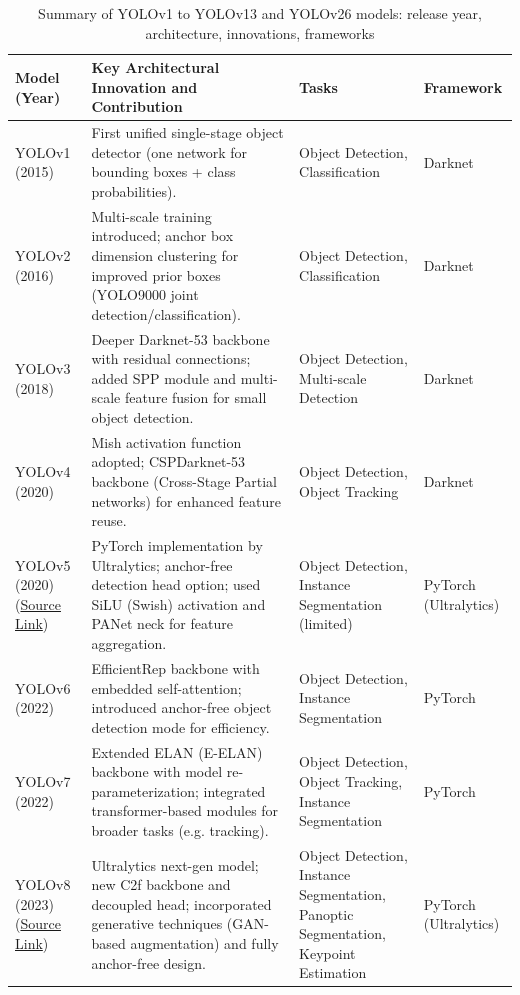 \documentclass{article}
\begin{document}
\begin{table}[h!]\centering
\caption{Summary of YOLOv1 to YOLOv13 and YOLOv26 models: release year, architecture, innovations, frameworks}
\label{tab:comparison}
\scriptsize
\begin{tabular}{p{4cm} p{6.5cm} p{2.2cm} p{2cm}}
\hline
\textbf{Model (Year)} & \textbf{Key Architectural Innovation and Contribution} & \textbf{Tasks} & \textbf{Framework} \\
\hline
YOLOv1 (2015) \cite{redmon2016you} & First unified single-stage object detector (one network for bounding boxes + class probabilities). & Object Detection, Classification & Darknet \\
YOLOv2 (2016)  \cite{redmon2017yolo9000} & Multi-scale training introduced; anchor box dimension clustering for improved prior boxes (YOLO9000 joint detection/classification). & Object Detection, Classification & Darknet \\
YOLOv3 (2018) \cite{redmon2018yolov3} & Deeper Darknet-53 backbone with residual connections; added SPP module and multi-scale feature fusion for small object detection. & Object Detection, Multi-scale Detection & Darknet \\
YOLOv4 (2020) \cite{bochkovskiy2020yolov4} & Mish activation function adopted; CSPDarknet-53 backbone (Cross-Stage Partial networks) for enhanced feature reuse. & Object Detection, Object Tracking & Darknet \\
YOLOv5 (2020) (\href{https://github.com/ultralytics/yolov5}{Source Link}) & PyTorch implementation by Ultralytics; anchor-free detection head option; used SiLU (Swish) activation and PANet neck for feature aggregation. & Object Detection, Instance Segmentation (limited) & PyTorch \newline  (Ultralytics) \\
YOLOv6 (2022) \cite{li2022yolov6} & EfficientRep backbone with embedded self-attention; introduced anchor-free object detection mode for efficiency. & Object Detection, Instance Segmentation & PyTorch \\
YOLOv7 (2022) \cite{wang2023yolov7} & Extended ELAN (E-ELAN) backbone with model re-parameterization; integrated transformer-based modules for broader tasks (e.g. tracking). & Object Detection, Object Tracking, Instance Segmentation & PyTorch \\
YOLOv8 (2023) (\href{https://docs.ultralytics.com/models/yolov8/}{Source Link}) & Ultralytics next-gen model; new C2f backbone and decoupled head; incorporated generative techniques (GAN-based augmentation) and fully anchor-free design. & Object Detection, Instance Segmentation, Panoptic Segmentation, Keypoint Estimation & PyTorch \newline (Ultralytics) \\

\end{tabular}
\end{table}
\end{document}
